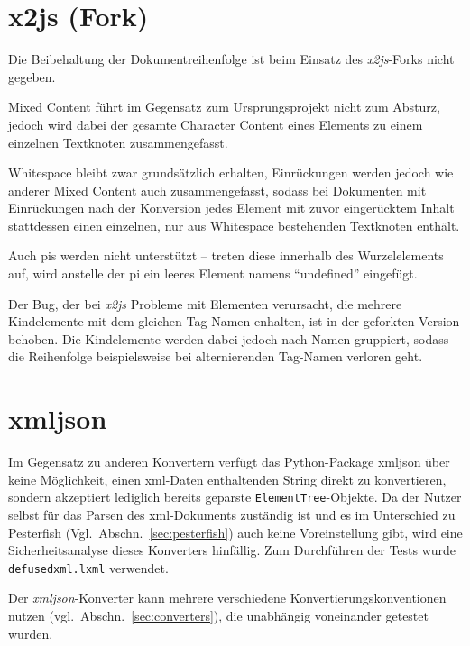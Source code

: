 
\section{x2js (Fork)}
\label{sec:x2js-fork}

Die Beibehaltung der Dokumentreihenfolge ist beim Einsatz des \emph{x2js}-Forks nicht gegeben.

Mixed Content führt im Gegensatz zum Ursprungsprojekt nicht zum Absturz, jedoch wird dabei der gesamte Character Content eines Elements zu einem einzelnen Textknoten zusammengefasst.

Whitespace bleibt zwar grundsätzlich erhalten, Einrückungen werden jedoch wie anderer Mixed Content auch zusammengefasst, sodass bei Dokumenten mit Einrückungen nach der Konversion jedes Element mit zuvor eingerücktem Inhalt stattdessen einen einzelnen, nur aus Whitespace bestehenden Textknoten enthält.

Auch \glspl{pi} werden nicht unterstützt -- treten diese innerhalb des Wurzelelements auf, wird anstelle der \gls{pi} ein leeres Element namens \enquote{undefined} eingefügt.

Der Bug, der bei \emph{x2js} Probleme mit Elementen verursacht, die mehrere Kindelemente mit dem gleichen Tag-Namen enhalten, ist in der geforkten Version behoben. Die Kindelemente werden dabei jedoch nach Namen gruppiert, sodass die Reihenfolge beispielsweise bei alternierenden Tag-Namen verloren geht.

\section{xmljson}
\label{sec:xmljson}

Im Gegensatz zu anderen Konvertern verfügt das Python-Package xmljson über keine Möglichkeit, einen \acrshort{xml}-Daten enthaltenden String direkt zu konvertieren, sondern akzeptiert lediglich bereits geparste \texttt{ElementTree}-Objekte. Da der Nutzer selbst für das Parsen des \acrshort{xml}-Dokuments zuständig ist und es im Unterschied zu Pesterfish (Vgl.~Abschn.~\ref{sec:pesterfish}) auch keine Voreinstellung gibt, wird eine Sicherheitsanalyse dieses Konverters hinfällig. Zum Durchführen der Tests wurde \texttt{defusedxml.lxml} verwendet.

Der \emph{xmljson}-Konverter kann mehrere verschiedene Konvertierungskonventionen nutzen (vgl.~Abschn.~\ref{sec:converters}), die unabhängig voneinander getestet wurden.

